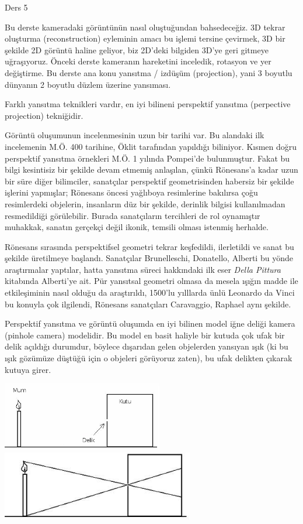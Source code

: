 \documentclass[12pt,fleqn]{article}\usepackage{../../common}
\begin{document}
Ders 5

Bu derste kameradaki görüntünün nasıl oluştuğundan bahsedeceğiz. 3D tekrar
oluşturma (reconstruction) eyleminin amacı bu işlemi tersine çevirmek, 3D
bir şekilde 2D görüntü haline geliyor, biz 2D'deki bilgiden 3D'ye geri
gitmeye uğraşıyoruz. Önceki derste kameranın hareketini inceledik, rotasyon
ve yer değiştirme. Bu derste ana konu yansıtma / izdüşüm (projection), yani
3 boyutlu dünyanın 2 boyutlu düzlem üzerine yansıması. 

Farklı yansıtma teknikleri vardır, en iyi bilineni perspektif yansıtma
(perpective projection) tekniğidir. 

Görüntü oluşumunun incelenmesinin uzun bir tarihi var. Bu alandaki ilk
incelemenin M.Ö. 400 tarihine, Öklit tarafından yapıldığı biliniyor. Kısmen
doğru perspektif yansıtma örnekleri M.Ö. 1 yılında Pompei'de
bulunmuştur. Fakat bu bilgi kesintisiz bir şekilde devam etmemiş anlaşılan,
çünkü Rönesans'a kadar uzun bir süre diğer bilimciler, sanatçılar
perspektif geometrisinden habersiz bir şekilde işlerini yapmışlar; Rönesans
öncesi yağlıboya resimlerine bakılırsa çoğu resimlerdeki objelerin,
insanların düz bir şekilde, derinlik bilgisi kullanılmadan resmedildiği
görülebilir. Burada sanatçıların tercihleri de rol oynamıştır muhakkak,
sanatın gerçekçi değil ikonik, temsili olması istenmiş herhalde. 

Rönesans sırasında perspektifsel geometri tekrar keşfedildi, ilerletildi ve
sanat bu şekilde üretilmeye başlandı. Sanatçılar Brunelleschi, Donatello,
Alberti bu yönde araştırmalar yaptılar, hatta yansıtma süreci hakkındaki
ilk eser {\em Della Pittura} kitabında Alberti'ye ait. Pür yansıtsal
geometri olmasa da mesela ışığın madde ile etkileşiminin nasıl olduğu da
araştırıldı, 1500'lu yılllarda ünlü Leonardo da Vinci bu konuyla çok
ilgilendi, Rönesans sanatçıları Caravaggio, Raphael aynı şekilde. 

Perspektif yansıtma ve görüntü oluşumda en iyi bilinen model iğne deliği
kamera (pinhole camera) modelidir. Bu model en basit haliyle bir kutuda
çok ufak bir delik açıldığı durumdur, böylece dışarıdan gelen objelerden
yansıyan ışık (ki bu ışık gözümüze düştüğü için o objeleri görüyoruz
zaten), bu ufak delikten çıkarak kutuya girer.

\includegraphics[height=3cm]{pinhole3.png}
\includegraphics[height=3cm]{pinhole4.png}
\end{document}
